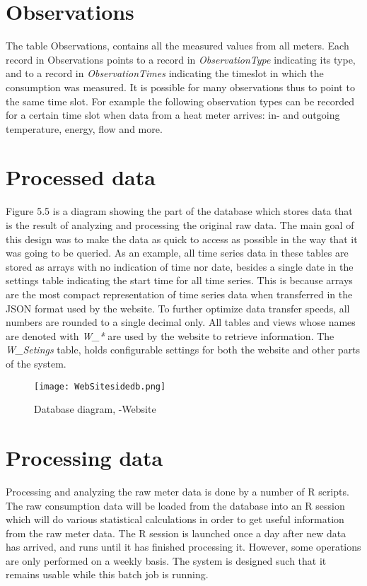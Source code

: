 \section*{Observations}
The table Observations, contains all the measured values from all meters. Each record in Observations points to a record in \emph{ObservationType} indicating its type, and to a record in \emph{ObservationTimes} indicating the timeslot in which the consumption was measured. It is possible for many observations thus to point to the same time slot. For example the following observation types can be recorded for a certain time slot when data from a heat meter arrives: in- and outgoing temperature, energy, flow and more.
\section*{Processed data}
Figure 5.5 is a diagram showing the part of the database which stores data that is the result of analyzing and processing the original raw data. The main goal of this design was to make the data as quick to access as possible in the way that it was going to be queried. As an example, all time series data in these tables are stored as arrays with no indication of time nor date, besides a single date in the settings table indicating the start time for all time series. This is because arrays are the most compact representation of time series data when transferred in the JSON format used by the website. To further optimize data transfer speeds, all numbers are rounded to a single decimal only.
All tables and views whose names are denoted with \emph{W\_*} are used by the website to retrieve information. The \emph{W\_Setings} table, holds configurable settings for both the website and other parts of the system.
\begin{figure}
\texttt{[image: WebSitesidedb.png]}
\caption{Database diagram, -Website}
\end{figure}
\section{Processing data}
Processing and analyzing the raw meter data is done by a number of R scripts. The raw consumption data will be loaded from the database into an R session which will do various statistical calculations in order to get useful information from the raw meter data. The R session is launched once a day after new data has arrived, and runs until it has finished processing it. However, some operations are only performed on a weekly basis. The system is designed such that it remains usable while this batch job is running.

